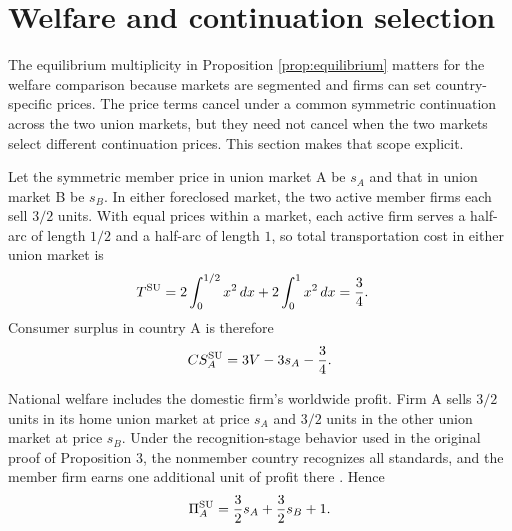 \section{Welfare and continuation selection}\label{sec:welfare}

The equilibrium multiplicity in Proposition \ref{prop:equilibrium} matters for the welfare comparison because markets are segmented and firms can set country-specific prices. The price terms cancel under a common symmetric continuation across the two union markets, but they need not cancel when the two markets select different continuation prices. This section makes that scope explicit.

Let the symmetric member price in union market A be $s_A$ and that in union market B be $s_B$. In either foreclosed market, the two active member firms each sell $3/2$ units. With equal prices within a market, each active firm serves a half-arc of length $1/2$ and a half-arc of length $1$, so total transportation cost in either union market is
\begin{align}\label{eq:transport-foreclosure}
 T^{\mathrm{SU}}
 &=2\int_{0}^{1/2}x^2\,dx+2\int_{0}^{1}x^2\,dx
 =\frac34.
\end{align}
Consumer surplus in country A is therefore
\begin{equation}\label{eq:cs-su}
 CS_A^{\mathrm{SU}}=3V-3s_A-\frac34.
\end{equation}

National welfare includes the domestic firm's worldwide profit. Firm A sells $3/2$ units in its home union market at price $s_A$ and $3/2$ units in the other union market at price $s_B$. Under the recognition-stage behavior used in the original proof of Proposition 3, the nonmember country recognizes all standards, and the member firm earns one additional unit of profit there \citep[p.~382]{gandalshy2001}. Hence
\begin{equation}\label{eq:profit-su}
 \Pi_A^{\mathrm{SU}}=\frac32 s_A+\frac32 s_B+1.
\end{equation}

